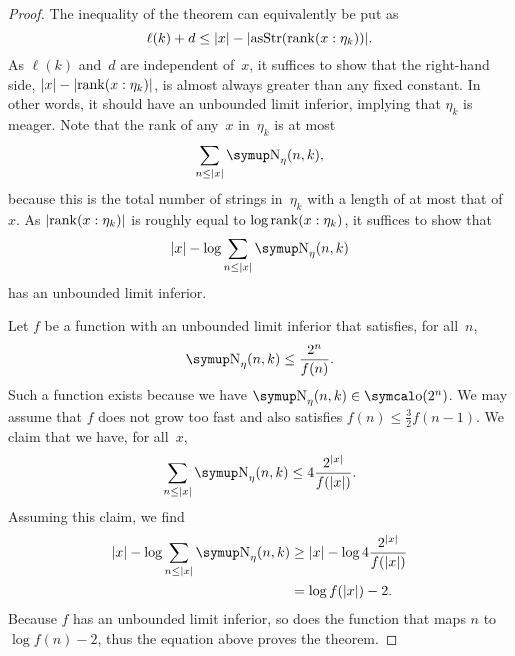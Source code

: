\begin{proof}
  The inequality of the theorem can equivalently be put as
  \begin{equation*}
    \ell(k) + d \le {\lvert x\rvert} - {\lvert\operatorname{asStr}(\operatorname{rank}(x : \eta_k))\rvert}.
  \end{equation*}
  As $\ell(k)$ and~$d$ are independent of~$x$, it suffices to show that the right-hand side, ${\lvert x\rvert} - {\lvert\operatorname{rank}(x : \eta_k)\rvert}$, is almost always greater than any fixed constant.
  In other words, it should have an unbounded limit inferior, implying that $\eta_k$ is meager.
  Note that the rank of any~$x$ in~$\eta_k$ is at most
  \begin{equation*}
    \sum_{n \le \length{x}} \upN_\eta(n, k),
  \end{equation*}
  because this is the total number of strings in~$\eta_k$ with a length of at most that of~$x$.
  As ${\lvert\operatorname{rank}(x : \eta_k)\rvert}$ is roughly equal to $\log \operatorname{rank}(x : \eta_k)$, it suffices to show that
  \begin{equation*}
    \length{x} - \log \sum_{n \le \length{x}} \upN_\eta(n, k)
  \end{equation*}
  has an unbounded limit inferior.

  Let $f$ be a function with an unbounded limit inferior that satisfies, for all~$n$,
  \begin{equation*}
    \upN_\eta(n, k) \le \frac{2^n}{f(n)}.
  \end{equation*}
  Such a function exists because we have $\upN_\eta(n, k) \in \littleo(2^n)$.
  We may assume that $f$ does not grow too fast and also satisfies $f(n) \le \frac{3}{2} f(n - 1)$.
  We claim that we have, for all~$x$,
  \begin{equation}
  \label{eq:compression_induction}
    \sum_{n \le \length{x}} \upN_\eta(n, k) \le 4 \frac{2^\length{x}}{f(\length{x})}.
  \end{equation}
  Assuming this claim, we find
  \begin{align*}
    \length{x} - \log \sum_{n \le \length{x}} \upN_\eta(n, k)
      &\ge \length{x} - \log 4 \frac{2^\length{x}}{f(\length{x})} \\
      &= \log f(\length{x}) - 2.
  \end{align*}
  Because $f$ has an unbounded limit inferior, so does the function that maps $n$ to $\log f(n) - 2$, thus the equation above proves the theorem.


\end{proof}
